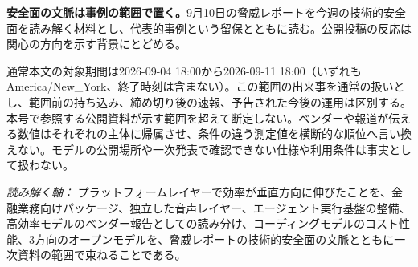 \begin{tcolorbox}[enhanced,colback=SurveySoft,colframe=SurveyRule,boxrule=0.4pt,arc=1mm,left=3mm,right=3mm,top=2mm,bottom=2mm]
\textbf{安全面の文脈は事例の範囲で置く。}\quad 9月10日の脅威レポートを今週の技術的安全面を読み解く材料とし、代表的事例という留保とともに読む。公開投稿の反応は関心の方向を示す背景にとどめる。
\end{tcolorbox}

\vspace{2mm}
\begin{claimboundary}[この号の読み方]
通常本文の対象期間は2026-09-04 18:00から2026-09-11 18:00（いずれもAmerica/New\_York、終了時刻は含まない）。この範囲の出来事を通常の扱いとし、範囲前の持ち込み、締め切り後の速報、予告された今後の運用は区別する。本号で参照する公開資料が示す範囲を超えて断定しない。ベンダーや報道が伝える数値はそれぞれの主体に帰属させ、条件の違う測定値を横断的な順位へ言い換えない。モデルの公開場所や一次発表で確認できない仕様や利用条件は事実として扱わない。
\end{claimboundary}

\vspace{2mm}
\noindent\textit{読み解く軸：} プラットフォームレイヤーで効率が垂直方向に伸びたことを、金融業務向けパッケージ、独立した音声レイヤー、エージェント実行基盤の整備、高効率モデルのベンダー報告としての読み分け、コーディングモデルのコスト性能、3方向のオープンモデルを、脅威レポートの技術的安全面の文脈とともに一次資料の範囲で束ねることである。

